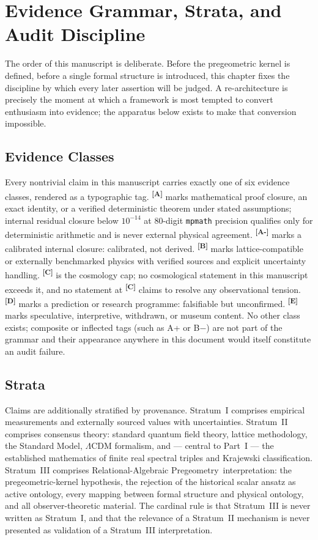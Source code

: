 \documentclass[12pt,a4paper,twoside]{article}
\theoremstyle{plain}
\theoremstyle{definition}
\theoremstyle{remark}
\newcommand{\ProjectShort}{Relational-Algebraic Pregeometry}
\newcommand{\RAP}{\ProjectShort}
\newcommand{\catmark}[1]{\textsuperscript{\textsf{\textbf{[#1]}}}}
\begin{document}
\section{Evidence Grammar, Strata, and Audit Discipline}
\label{sec:evidence-apparatus}

\noindent The order of this manuscript is deliberate. Before the
pregeometric kernel is defined, before a single formal structure is
introduced, this chapter fixes the discipline by which every later
assertion will be judged. A re-architecture is precisely the moment at
which a framework is most tempted to convert enthusiasm into evidence; the
apparatus below exists to make that conversion impossible.

\subsection{Evidence Classes}
\label{subsec:evidence-classes}

Every nontrivial claim in this manuscript carries exactly one of six evidence
classes, rendered as a typographic tag. \catmark{A} marks mathematical
proof closure, an exact identity, or a verified deterministic theorem
under stated assumptions; internal residual closure below $10^{-14}$ at
80-digit \texttt{mpmath} precision qualifies only for deterministic
arithmetic and is never external physical agreement. \catmark{A-} marks a
calibrated internal closure: calibrated, not derived. \catmark{B} marks
lattice-compatible or externally benchmarked physics with verified sources
and explicit uncertainty handling. \catmark{C} is the cosmology cap; no
cosmological statement in this manuscript exceeds it, and no statement at
\catmark{C} claims to resolve any observational tension. \catmark{D} marks
a prediction or research programme: falsifiable but unconfirmed.
\catmark{E} marks speculative, interpretive, withdrawn, or museum content.
No other class exists; composite or inflected tags (such as A+ or B$-$)
are not part of the grammar and their appearance anywhere in this document
would itself constitute an audit failure.

\subsection{Strata}
\label{subsec:strata}

Claims are additionally stratified by provenance. Stratum~I comprises
empirical measurements and externally sourced values with uncertainties.
Stratum~II comprises consensus theory: standard quantum field theory,
lattice methodology, the Standard Model, $\Lambda$CDM formalism, and ---
central to Part~I --- the established mathematics of finite real spectral
triples and Krajewski classification. Stratum~III comprises \RAP\
interpretation: the pregeometric-kernel hypothesis, the rejection of the historical scalar ansatz as active ontology,
every mapping between formal structure and physical ontology, and all
observer-theoretic material. The cardinal rule is that Stratum~III is
never written as Stratum~I, and that the relevance of a Stratum~II
mechanism is never presented as validation of a Stratum~III
interpretation.
\end{document}
